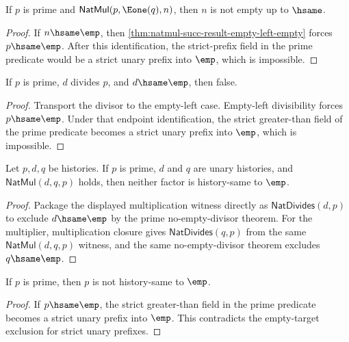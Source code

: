 \begin{theorem}
\label{thm:natprime-natmul-succ-result-not-empty}
If \(p\) is prime and \(\mathsf{NatMul}(p,\Eone(q),n)\), then \(n\) is not
empty up to \(\hsame\).
\end{theorem}
\begin{proof}
If \(n\hsame\emp\), then
\autoref{thm:natmul-succ-result-empty-left-empty} forces \(p\hsame\emp\).
After this identification, the strict-prefix field in the prime predicate
would be a strict unary prefix into \(\emp\), which is impossible.
\end{proof}

\begin{theorem}
\label{thm:natprime-divisor-empty-absurd}
If $p$ is prime, $d$ divides $p$, and $d\hsame\emp$, then false.
\end{theorem}
\begin{proof}
Transport the divisor to the empty-left case. Empty-left divisibility forces
$p\hsame\emp$. Under that endpoint identification, the strict greater-than
field of the prime predicate becomes a strict unary prefix into $\emp$, which
is impossible.
\end{proof}

\begin{theorem}
\label{thm:nat-prime-natmul-factors-not-empty}
Let $p,d,q$ be histories. If $p$ is prime, $d$ and $q$ are unary histories,
and $\mathsf{NatMul}(d,q,p)$ holds, then neither factor is history-same to
$\emp$.
\end{theorem}
\begin{proof}
Package the displayed multiplication witness directly as
$\mathsf{NatDivides}(d,p)$ to exclude $d\hsame\emp$ by the prime no-empty-divisor
theorem. For the multiplier, multiplication closure gives
$\mathsf{NatDivides}(q,p)$ from the same $\mathsf{NatMul}(d,q,p)$ witness,
and the same no-empty-divisor theorem excludes $q\hsame\emp$.
\end{proof}

\begin{theorem}
\label{thm:natprime-empty-absurd}
If $p$ is prime, then $p$ is not history-same to $\emp$.
\end{theorem}
\begin{proof}
If $p\hsame\emp$, the strict greater-than field in the prime predicate becomes
a strict unary prefix into $\emp$. This contradicts the empty-target exclusion
for strict unary prefixes.
\end{proof}

